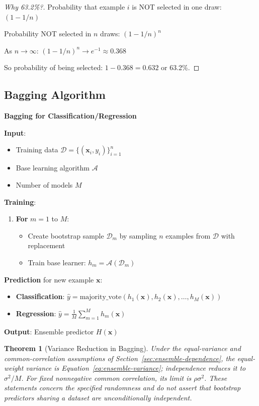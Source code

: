\documentclass[11pt,twoside]{article}
\numberwithin{equation}{section}
\newcommand{\vect}[1]{\bm{#1}}
\theoremstyle{plain}
\newtheorem{theorem}{Theorem}[section]
\theoremstyle{definition}
\theoremstyle{remark}
\begin{document}
\begin{proof}[Why 63.2\%?]
Probability that example $i$ is NOT selected in one draw: $(1 - 1/n)$

Probability NOT selected in $n$ draws: $(1 - 1/n)^n$

As $n \to \infty$: $(1 - 1/n)^n \to e^{-1} \approx 0.368$

So probability of being selected: $1 - 0.368 = 0.632$ or 63.2\%.
\end{proof}

\subsection{Bagging Algorithm}

\begin{algorithmbox}
\textbf{Bagging for Classification/Regression}

\textbf{Input}: 
\begin{itemize}
\item Training data $\mathcal{D} = \{(\vect{x}_i, y_i)\}_{i=1}^n$
\item Base learning algorithm $\mathcal{A}$
\item Number of models $M$
\end{itemize}

\textbf{Training}:
\begin{enumerate}
\item \textbf{For} $m = 1$ to $M$:
\begin{itemize}
\item Create bootstrap sample $\mathcal{D}_m$ by sampling $n$ examples from $\mathcal{D}$ with replacement
\item Train base learner: $h_m = \mathcal{A}(\mathcal{D}_m)$
\end{itemize}
\end{enumerate}

\textbf{Prediction} for new example $\vect{x}$:
\begin{itemize}
\item \textbf{Classification}: $\hat{y} = \text{majority\_vote}(h_1(\vect{x}), h_2(\vect{x}), \ldots, h_M(\vect{x}))$
\item \textbf{Regression}: $\hat{y} = \frac{1}{M}\sum_{m=1}^M h_m(\vect{x})$
\end{itemize}

\textbf{Output}: Ensemble predictor $H(\vect{x})$
\end{algorithmbox}

\begin{theorem}[Variance Reduction in Bagging]
Under the equal-variance and common-correlation assumptions of
Section~\ref{sec:ensemble-dependence}, the equal-weight variance is
Equation~\eqref{eq:ensemble-variance}; independence reduces it to $\sigma^2/M$.
For fixed nonnegative common correlation, its limit is $\rho\sigma^2$.
These statements concern the specified randomness and do not assert that
bootstrap predictors sharing a dataset are unconditionally independent.
\end{theorem}
\end{document}
